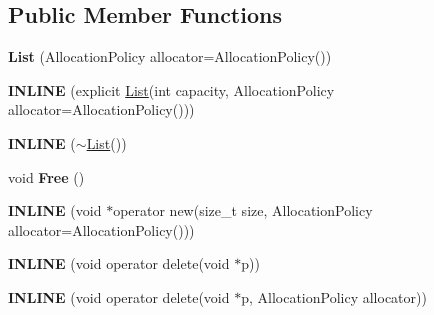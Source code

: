 \subsection*{Public Member Functions}
\begin{DoxyCompactItemize}
\item 
{\bfseries List} (Allocation\+Policy allocator=Allocation\+Policy())\hypertarget{classv8_1_1internal_1_1_list_ac9af844caa57e127290785bc3d5a1f0b}{}\label{classv8_1_1internal_1_1_list_ac9af844caa57e127290785bc3d5a1f0b}

\item 
{\bfseries I\+N\+L\+I\+NE} (explicit \hyperlink{classv8_1_1internal_1_1_list}{List}(int capacity,                                                                                   Allocation\+Policy allocator=Allocation\+Policy()))\hypertarget{classv8_1_1internal_1_1_list_a8f79749fd51002a6e8881f34c7d60d48}{}\label{classv8_1_1internal_1_1_list_a8f79749fd51002a6e8881f34c7d60d48}

\item 
{\bfseries I\+N\+L\+I\+NE} ($\sim$\hyperlink{classv8_1_1internal_1_1_list}{List}())\hypertarget{classv8_1_1internal_1_1_list_aac7d78f1e7e855f6d4367cc4997c514d}{}\label{classv8_1_1internal_1_1_list_aac7d78f1e7e855f6d4367cc4997c514d}

\item 
void {\bfseries Free} ()\hypertarget{classv8_1_1internal_1_1_list_ae04179c064e23cf7737a46bcf4fc7124}{}\label{classv8_1_1internal_1_1_list_ae04179c064e23cf7737a46bcf4fc7124}

\item 
{\bfseries I\+N\+L\+I\+NE} (void $\ast$operator new(size\+\_\+t size,                                                                                                       Allocation\+Policy allocator=Allocation\+Policy()))\hypertarget{classv8_1_1internal_1_1_list_a45f48d0771371c9c4f4f953436d60f23}{}\label{classv8_1_1internal_1_1_list_a45f48d0771371c9c4f4f953436d60f23}

\item 
{\bfseries I\+N\+L\+I\+NE} (void operator delete(void $\ast$p))\hypertarget{classv8_1_1internal_1_1_list_ae662a2973e9943028685becf85d16b8d}{}\label{classv8_1_1internal_1_1_list_ae662a2973e9943028685becf85d16b8d}

\item 
{\bfseries I\+N\+L\+I\+NE} (void operator delete(void $\ast$p, Allocation\+Policy allocator))\hypertarget{classv8_1_1internal_1_1_list_a1c3dba6edd57d1b14fc86cd093c369c6}{}\label{classv8_1_1internal_1_1_list_a1c3dba6edd57d1b14fc86cd093c369c6}


\end{DoxyCompactItemize}
